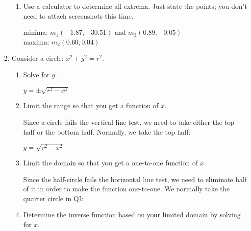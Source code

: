 \documentclass[letterpaper,12pt,fleqn]{article}
\begin{document}
\begin{enumerate}
\begin{enumerate}
  \item Use a calculator to determine all extrema. Just state the points; you
    don't need to attach screenshots this time.

    minima: $m_1(-1.87,-30.51)$ and $m_3(0.89,-0.05)$ \\
    maxima: $m_2(0.60,0.04)$
  \end{enumerate}

\item Consider a circle: $x^2+y^2=r^2$.
  \begin{enumerate}
  \item Solve for $y$.

    $y=\pm\sqrt{r^2-x^2}$

    
  \item Limit the range so that you get a function of $x$.

    Since a circle fails the vertical line test, we need to take either the
    top half or the bottom half. Normally, we take the top half:

    $y=\sqrt{r^2-x^2}$
    

  \item Limit the domain so that you get a one-to-one function of $x$.

    Since the half-circle fails the horizontal line test, we need to eliminate
    half of it in order to make the function one-to-one. We normally take
    the quarter circle in QI:
    

  \item Determine the inverse function based on your limited domain by solving
    for $x$.


\end{enumerate}
\end{enumerate}
\end{document}
